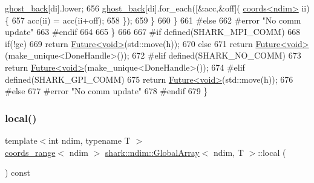 \begin{DoxyCode}
      \hyperlink{classshark_1_1ndim_1_1_global_array_a97eb47a8cd80d98627706e673259a310}{ghost\_back}[di].lower;
656                         \hyperlink{classshark_1_1ndim_1_1_global_array_a97eb47a8cd80d98627706e673259a310}{ghost\_back}[di].for\_each([&acc,&off](
      \hyperlink{structshark_1_1ndim_1_1coords}{coords<ndim>} ii) \{
657                                 acc(ii) = acc(ii+off);
658                                 \});
659                     \}
660                 \}
661 \textcolor{preprocessor}{#else}
662 \textcolor{preprocessor}{#error "No comm update"}
663 \textcolor{preprocessor}{#endif}
664 
665     \}
666 
667 \textcolor{preprocessor}{#if defined(SHARK\_MPI\_COMM)}
668     \textcolor{keywordflow}{if}(!gc)
669         \textcolor{keywordflow}{return} \hyperlink{structshark_1_1_future_3_01void_01_4}{Future<void>}(std::move(h));
670     \textcolor{keywordflow}{else}
671         \textcolor{keywordflow}{return} \hyperlink{structshark_1_1_future_3_01void_01_4}{Future<void>}(make\_unique<DoneHandle>());
672 \textcolor{preprocessor}{#elif defined(SHARK\_NO\_COMM)}
673     \textcolor{keywordflow}{return} \hyperlink{structshark_1_1_future_3_01void_01_4}{Future<void>}(make\_unique<DoneHandle>());
674 \textcolor{preprocessor}{#elif defined(SHARK\_GPI\_COMM)}
675         \textcolor{keywordflow}{return} \hyperlink{structshark_1_1_future_3_01void_01_4}{Future<void>}(std::move(h));
676 \textcolor{preprocessor}{#else}
677 \textcolor{preprocessor}{#error "No comm update"}
678 \textcolor{preprocessor}{#endif}
679 \}
\end{DoxyCode}
\hypertarget{classshark_1_1ndim_1_1_global_array_a871fb1acbd9bd46439766121053e20d1}{}\label{classshark_1_1ndim_1_1_global_array_a871fb1acbd9bd46439766121053e20d1} 
\subsubsection{\texorpdfstring{local()}{local()}}
{\footnotesize\ttfamily template$<$int ndim, typename T $>$ \\
\hyperlink{structshark_1_1ndim_1_1coords__range}{coords\+\_\+range}$<$ ndim $>$ \hyperlink{classshark_1_1ndim_1_1_global_array}{shark\+::ndim\+::\+Global\+Array}$<$ ndim, T $>$\+::local (\begin{DoxyParamCaption}{ }\end{DoxyParamCaption}) const\hspace{0.3cm}{\ttfamily [inline]}}



